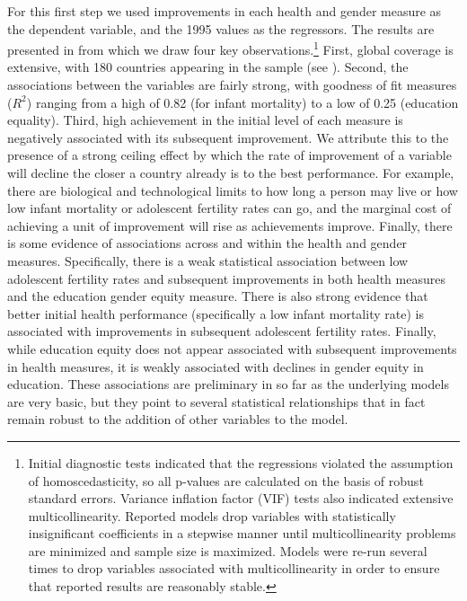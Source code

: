 \documentclass[12pt]{article}
\begin{document}
For this first step we used improvements in each health and gender measure as the dependent variable, and the 1995 values as the regressors. The results are presented in  from which we draw four key observations.\footnote{
Initial diagnostic tests indicated that the regressions violated the assumption of homoscedasticity, so all p-values are calculated on the basis of robust standard errors. Variance inflation factor (VIF) tests also indicated extensive multicollinearity. Reported models drop variables with statistically insignificant coefficients in a stepwise manner until multicollinearity problems are minimized and sample size is maximized. Models were re-run several times to drop variables associated with multicollinearity in order to ensure that reported results are reasonably stable.}
First, global coverage is extensive, with 180 countries appearing in the sample (see ). Second, the associations between the variables are fairly strong, with goodness of fit measures ($R^2$) ranging from a high of 0.82 (for infant mortality) to a low of 0.25 (education equality). Third, high achievement in the initial level of each measure is negatively associated with its subsequent improvement. We attribute this to the presence of a strong ceiling effect by which the rate of improvement of a variable will decline the closer a country already is to the best performance. For example, there are biological and technological limits to how long a person may live or how low infant mortality or adolescent fertility rates can go, and the marginal cost of achieving a unit of improvement will rise as achievements improve. Finally, there is some evidence of associations across and within the health and gender measures. Specifically, there is a weak statistical association between low adolescent fertility rates  and subsequent improvements in both health measures and the education gender equity measure.  There is also strong evidence that better initial health performance (specifically a low infant mortality rate) is associated with improvements in subsequent adolescent fertility rates.  Finally, while education equity does not appear associated with subsequent improvements in health measures, it is weakly associated with declines in gender equity in education. These associations are preliminary in so far as the underlying models are very basic, but they point to several statistical relationships that in fact remain robust to the addition of other variables to the model.


\end{document}
